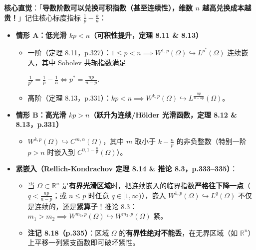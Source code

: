 \documentclass[11pt,a4paper]{article}
\providecommand{\tightlist}{\setlength{\itemsep}{1.8pt}\setlength{\parskip}{0pt}}
\renewenvironment{quote}{%
  \begin{tcolorbox}[
    enhanced,
    breakable,
    colback=AccentSoft!48!white,
    colframe=AccentMain,
    boxrule=0pt,
    leftrule=2.8pt,
    arc=2.5pt,
    left=9pt, right=8pt, top=6pt, bottom=6pt,
    before skip=5.5pt, after skip=5.5pt
  ]\small
}{%
  \end{tcolorbox}%
}
\newcommand{\FitDisplayMath}[1]{%
  \par\vspace{4pt}\noindent
  \begin{adjustbox}{max width=\linewidth, center}
    $\displaystyle #1$
  \end{adjustbox}
  \par\vspace{4pt}%
}
\begin{document}
\begin{quote}
\textbf{核心直觉}：「\textbf{导数阶数可以兑换可积指数（甚至连续性），维数 \(n\) 越高兑换成本越贵！}」记住核心标度指标 \(\frac{1}{p} - \frac{k}{n}\)：
\end{quote}

\begin{itemize}
\tightlist
\item
  \textbf{情形 A：低光滑 \(kp < n\)（可积性提升，定理 8.11 \& 8.13）}

  \begin{itemize}
  \tightlist
  \item
    一阶（定理 8.11，p.327）：\(1 \le p < n \implies W^{1,p}(\Omega) \hookrightarrow L^{p^*}(\Omega)\) 连续嵌入，其中 Sobolev 共轭指数满足 
\FitDisplayMath{\frac{1}{p^*} = \frac{1}{p} - \frac{1}{n} \iff p^* = \frac{np}{n - p}.}

  \item
    高阶（定理 8.13，p.331）：\(kp < n \implies W^{k,p}(\Omega) \hookrightarrow L^{\frac{np}{n-kp}}(\Omega)\)。
  \end{itemize}
\item
  \textbf{情形 B：高光滑 \(kp > n\)（跃升为连续/Hölder 光滑函数，定理 8.12 \& 8.13，p.331）}

  \begin{itemize}
  \tightlist
  \item
    \(W^{k,p}(\Omega) \hookrightarrow C^{m,\alpha}(\Omega)\)，其中 \(m\) 取小于 \(k - \frac{n}{p}\) 的非负整数（特别一阶 \(p > n\) 时嵌入到 \(C^{0, 1 - \frac{n}{p}}(\Omega)\)）。
  \end{itemize}
\item
  \textbf{紧嵌入（Rellich-Kondrachov 定理 8.14 \& 推论 8.3，p.333--335）}：

  \begin{itemize}
  \tightlist
  \item
    当 \(\Omega \subset \mathbb{R}^n\) 是\textbf{有界光滑区域}时，把连续嵌入的临界指数\textbf{严格往下降一点}（\(q < \frac{np}{n-p}\)；或 \(n \le p\) 时任意 \(q \in [1, \infty)\)），嵌入 \(W^{1,p}(\Omega) \hookrightarrow L^q(\Omega)\) 不仅是连续的，还是\textbf{紧算子}！推论 8.3：\(m_1 > m_2 \implies W^{m_1,p}(\Omega) \hookrightarrow W^{m_2,p}(\Omega)\) 紧。
  \item
    \textbf{注记 8.18（p.335）}：区域 \(\Omega\) 的\textbf{有界性绝对不能丢}，在无界区域（如 \(\mathbb{R}^n\)）上平移一列紧支函数即可破坏紧性。
  \end{itemize}
\end{itemize}
\end{document}
